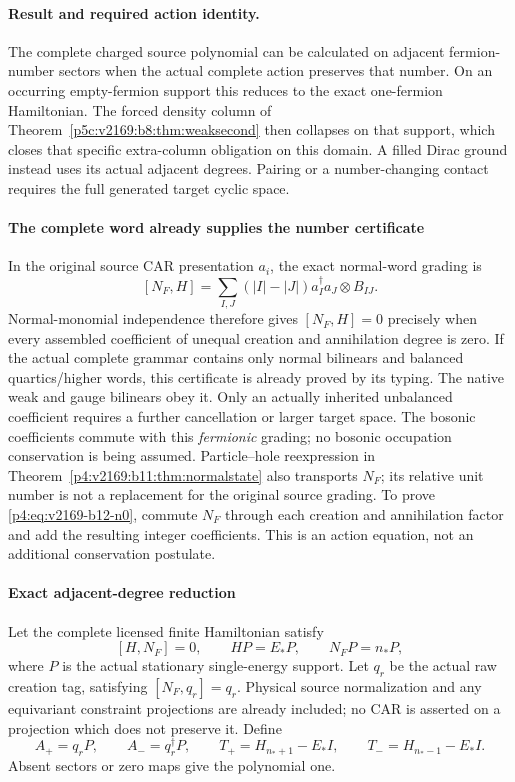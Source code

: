 \documentclass[12pt,a4paper]{article}
\begin{document}
\paragraph{Result and required action identity.}
The complete charged source polynomial can be calculated on adjacent
fermion-number sectors when the actual complete action preserves that number.
On an occurring empty-fermion support this reduces to the exact one-fermion
Hamiltonian. The forced density column of Theorem~\ref{p5c:v2169:b8:thm:weaksecond} then collapses on that
support, which closes that specific extra-column obligation on this domain.
A filled Dirac ground instead uses its actual adjacent degrees. Pairing or a
number-changing contact requires the full generated target cyclic space.



\paragraph{The complete word already supplies the number certificate}
In the original source CAR presentation $a_i$, the exact normal-word grading is
\begin{equation}
 \boxed{[N_F,H]=
       \sum_{I,J}(|I|-|J|)a_I^\dagger a_J\otimes B_{IJ}.} \label{p4:eq:v2169-b12-n0}
\end{equation}
Normal-monomial independence therefore gives $[N_F,H]=0$ precisely when every
assembled coefficient of unequal creation and annihilation degree is zero.
If the actual complete grammar contains only normal bilinears and balanced
quartics/higher words, this certificate is already proved by its typing.
The native weak and gauge bilinears obey it. Only an actually inherited
unbalanced coefficient requires a further cancellation or larger target space.
The bosonic coefficients commute with this \emph{fermionic} grading; no
bosonic occupation conservation is being assumed.
Particle--hole reexpression in Theorem~\ref{p4:v2169:b11:thm:normalstate} also transports $N_F$; its relative
unit number is not a replacement for the original source grading.
To prove \eqref{p4:eq:v2169-b12-n0}, commute $N_F$ through each creation and annihilation factor
and add the resulting integer coefficients. This is an action equation,
not an additional conservation postulate.



\paragraph{Exact adjacent-degree reduction}
Let the complete licensed finite Hamiltonian satisfy
\[
 [H,N_F]=0,\qquad HP=E_*P,\qquad N_FP=n_*P,
\]
where $P$ is the actual stationary single-energy support. Let $q_r$ be the
actual raw creation tag, satisfying $[N_F,q_r]=q_r$. Physical source
normalization and any equivariant constraint projections are already included;
no CAR is asserted on a projection which does not preserve it. Define
\begin{equation}
 A_+=q_rP,\qquad A_-=q_r^\dagger P,\qquad
 T_+=H_{n_*+1}-E_*I,\qquad T_-=H_{n_*-1}-E_*I .
 \label{p4:eq:v2169-b12-n1}
\end{equation}
Absent sectors or zero maps give the polynomial one.
\end{document}
